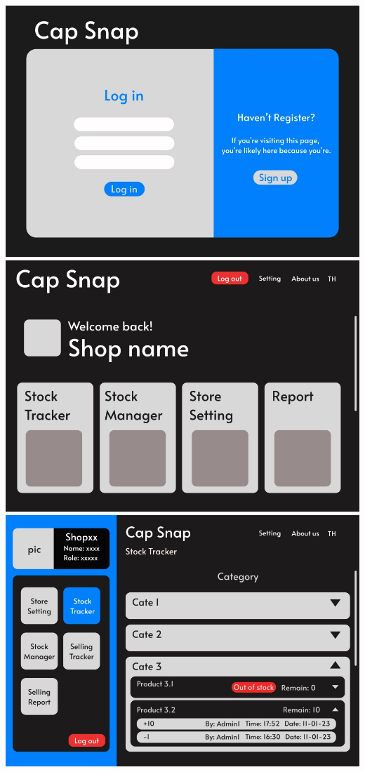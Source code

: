 {
 \includegraphics[scale=0.9]{pic/ui/3.jpg}
 \includegraphics[scale=0.9]{pic/ui/4.jpg}
}\\
{
\includegraphics[scale=0.9]{pic/ui/5.jpg}
}\\
